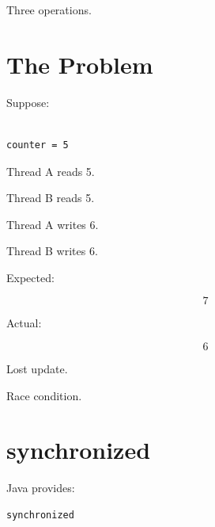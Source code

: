 \documentclass[11pt,a4paper]{book}
\begin{document}

Three operations.


\section{The Problem}

Suppose:

\begin{verbatim}

counter = 5

\end{verbatim}


Thread A reads 5.


Thread B reads 5.


Thread A writes 6.


Thread B writes 6.


Expected:

\[
7
\]


Actual:

\[
6
\]


Lost update.


Race condition.


\section{synchronized}

Java provides:

\begin{verbatim} 
synchronized
\end{verbatim}
\end{document}
